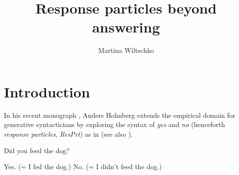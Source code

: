 \documentclass[output=paper]{LSP/langsci}
\author{Martina Wiltschko  \affiliation{University of British Columbia}
}
\title{Response particles beyond answering}
\begin{document}
\newcommand{\qab}[2][.88]{\parbox[t]{.8\textwidth}{\vspace*{-#1\baselineskip}#2}}
\section{Introduction}\label{sec:wiltschko:1}

In his recent monograph \citep{holmberg:15}, Anders Holmberg extends the empirical domain for generative syntacticians by exploring the syntax of \textit{yes} and \textit{no} (henceforth \textit{response particles}, \textit{ResPrt}) as in  (see also \citealt{Holmberg2001yesnofinnish,Holmberg2002,Holmberg2007,Holmberg2013,Holmberg2014finnishquestion}).

\ea
\label{ex:wiltschko:1}
   \begin{xlist} {Did you feed the dog?}
   \begin{xlista}
      \ex
	  {Yes.}   (= {I fed the dog.})
      \ex
	    {No.}  (= {I didn’t feed the dog}.)  
      \end{xlista}
\end{xlist}\z
\end{document}
